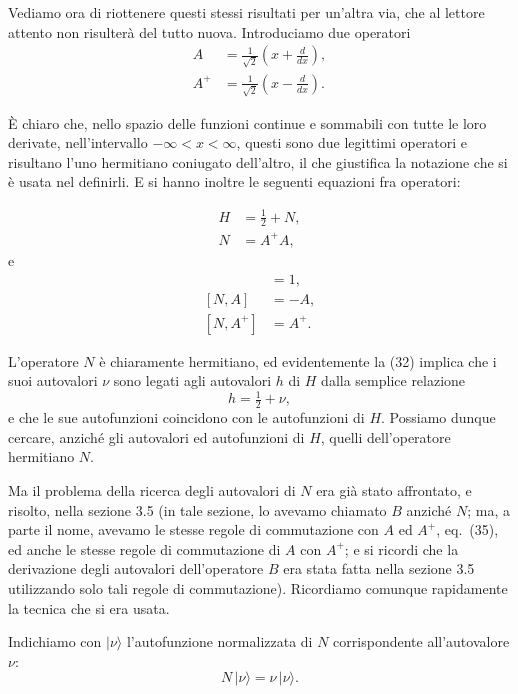 \documentclass[11pt, a4paper]{book}
\numberwithin{equation}{section}
\begin{document}
Vediamo ora di riottenere questi stessi risultati per un'altra via, che
al lettore attento non risulterà del tutto nuova. Introduciamo due operatori
\begin{align}
A   &= \frac{1}{\sqrt{2}}\left(x+\frac{d}{dx}\right), \tag{31a} \\
A^+ &= \frac{1}{\sqrt{2}}\left(x-\frac{d}{dx}\right). \tag{31b}
\end{align}

È chiaro che, nello spazio delle funzioni continue e sommabili con tutte le
loro derivate, nell'intervallo $-\infty < x < \infty$, questi sono due
legittimi operatori e risultano l'uno hermitiano coniugato dell'altro, il
che giustifica la notazione che si è usata nel definirli. E si hanno inoltre
le seguenti equazioni fra operatori:


\begin{align}
H &= \tfrac{1}{2} + N, \tag{32} \\
N &= A^+A, \tag{33}
\end{align}
e
\begin{align}
[A, A^+] &= 1, \tag{34} \\
[N, A]   &= -A, \tag{35a} \\
[N, A^+] &= A^+. \tag{35b}
\end{align}

L'operatore $N$ è chiaramente hermitiano, ed evidentemente la (32) implica
che i suoi autovalori $\nu$ sono legati agli autovalori $h$ di $H$ dalla
semplice relazione
\begin{equation}
h = \tfrac{1}{2} + \nu,
\end{equation}
e che le sue autofunzioni coincidono con le autofunzioni di $H$. Possiamo
dunque cercare, anziché gli autovalori ed autofunzioni di $H$, quelli
dell'operatore hermitiano $N$.

Ma il problema della ricerca degli autovalori di $N$ era già stato
affrontato, e risolto, nella sezione 3.5 (in tale sezione, lo avevamo
chiamato $B$ anziché $N$; ma, a parte il nome, avevamo le stesse regole
di commutazione con $A$ ed $A^+$, eq.\ (35), ed anche le stesse regole di
commutazione di $A$ con $A^+$; e si ricordi che la derivazione degli
autovalori dell'operatore $B$ era stata fatta nella sezione 3.5
utilizzando solo tali regole di commutazione). Ricordiamo comunque
rapidamente la tecnica che si era usata.

Indichiamo con $|\nu\rangle$ l'autofunzione normalizzata di $N$
corrispondente all'autovalore $\nu$:
\begin{equation}
N\,|\nu\rangle = \nu\,|\nu\rangle.
\end{equation}
\end{document}

